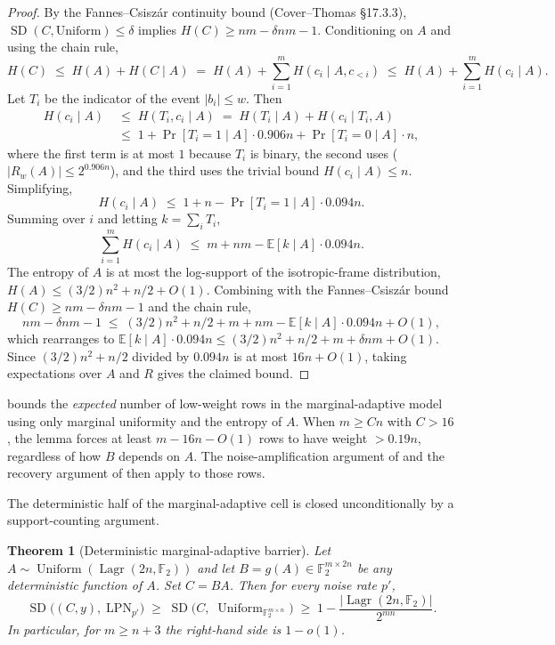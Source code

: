 \documentclass[11pt,a4paper]{article}
\theoremstyle{plain}
\newtheorem{theorem}{Theorem}[section]
\theoremstyle{definition}
\newcommand{\F}{\mathbb{F}}
\newcommand{\E}{\mathbb{E}}
\DeclareMathOperator{\Lagr}{Lagr}
\begin{document}
\begin{proof}
By the Fannes--Csisz\'{a}r continuity bound (Cover--Thomas \S17.3.3), $\operatorname{SD}(C,\text{Uniform})\le\delta$ implies $H(C)\ge nm-\delta nm-1$.  Conditioning on $A$ and using the chain rule,
\[
H(C)\;\le\;H(A)+H(C\mid A)\;=\;H(A)+\sum_{i=1}^{m}H(c_i\mid A,c_{<i})
\;\le\;H(A)+\sum_{i=1}^{m}H(c_i\mid A).
\]
Let $T_i$ be the indicator of the event $|b_i|\le w$.  Then
\begin{align*}
H(c_i\mid A)
&\;\le\;H(T_i,c_i\mid A)
\;=\;H(T_i\mid A)+H(c_i\mid T_i,A) \\
&\;\le\;1+\Pr[T_i=1\mid A]\cdot0.906n+\Pr[T_i=0\mid A]\cdot n,
\end{align*}
where the first term is at most $1$ because $T_i$ is binary, the second uses  ($|R_w(A)|\le2^{0.906n}$), and the third uses the trivial bound $H(c_i\mid A)\le n$.  Simplifying,
\[
H(c_i\mid A)\;\le\;1+n-\Pr[T_i=1\mid A]\cdot0.094n.
\]
Summing over $i$ and letting $k=\sum_i T_i$,
\[
\sum_{i=1}^{m}H(c_i\mid A)
\;\le\;m+nm-\E[k\mid A]\cdot0.094n.
\]
The entropy of $A$ is at most the log-support of the isotropic-frame distribution, $H(A)\le (3/2)n^{2}+n/2+O(1)$.  Combining with the Fannes--Csisz\'{a}r bound $H(C)\ge nm-\delta nm-1$ and the chain rule,
\[
nm-\delta nm-1
\;\le\;(3/2)n^{2}+n/2+m+nm-\E[k\mid A]\cdot0.094n+O(1),
\]
which rearranges to $\E[k\mid A]\cdot0.094n\le(3/2)n^{2}+n/2+m+\delta nm+O(1)$.  Since $(3/2)n^{2}+n/2$ divided by $0.094n$ is at most $16n+O(1)$, taking expectations over $A$ and $R$ gives the claimed bound.
\end{proof}

 bounds the \emph{expected} number of low-weight rows in the marginal-adaptive model using only marginal uniformity and the entropy of $A$.  When $m\ge Cn$ with $C>16$, the lemma forces at least $m-16n-O(1)$ rows to have weight $>0.19n$, regardless of how $B$ depends on $A$.  The noise-amplification argument of  and the recovery argument of  then apply to those rows.

The deterministic half of the marginal-adaptive cell is closed unconditionally by a support-counting argument.

\begin{theorem}[Deterministic marginal-adaptive barrier]
\label{thm:deterministic-marginal-adaptive}
Let $A\sim\operatorname{Uniform}(\Lagr(2n,\F_2))$ and let $B=g(A)\in\F_2^{m\times 2n}$ be any deterministic function of $A$.  Set $C=BA$.  Then for every noise rate $p'$,
\[
  \operatorname{SD}\bigl((C,y),\;\mathrm{LPN}_{p'}\bigr)
  \;\ge\;
  \operatorname{SD}\bigl(C,\;\operatorname{Uniform}_{\F_2^{m\times n}}\bigr)
  \;\ge\;
  1-\frac{|\Lagr(2n,\F_2)|}{2^{mn}}.
\]
In particular, for $m\ge n+3$ the right-hand side is $1-o(1)$.
\end{theorem}
\end{document}
